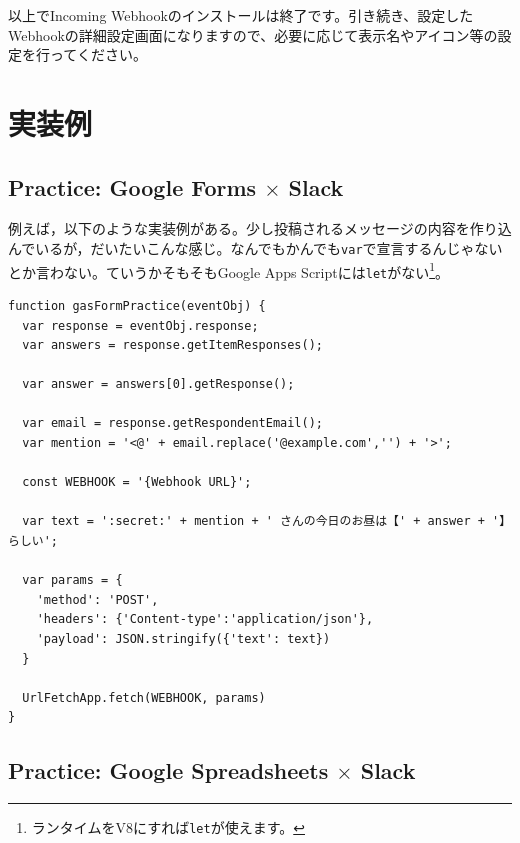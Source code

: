 \documentclass[uplatex,a4j]{jsarticle}
\begin{document}
以上でIncoming Webhookのインストールは終了です。引き続き、設定したWebhookの詳細設定画面になりますので、必要に応じて表示名やアイコン等の設定を行ってください。

\section{実装例}

\subsection{Practice: Google Forms $\times$ Slack}

例えば，以下のような実装例がある。少し投稿されるメッセージの内容を作り込んでいるが，だいたいこんな感じ。なんでもかんでも\verb|var|で宣言するんじゃないとか言わない。ていうかそもそもGoogle Apps Scriptには\verb|let|がない\footnote{ランタイムをV8にすれば\verb|let|が使えます。}。

\begin{lstlisting}[basicstyle=\ttfamily\footnotesize,frame=single,caption=Script Example for Forms practice]
function gasFormPractice(eventObj) {
  var response = eventObj.response;
  var answers = response.getItemResponses();
  
  var answer = answers[0].getResponse();
  
  var email = response.getRespondentEmail();
  var mention = '<@' + email.replace('@example.com','') + '>';
  
  const WEBHOOK = '{Webhook URL}';
  
  var text = ':secret:' + mention + ' さんの今日のお昼は【' + answer + '】らしい';
  
  var params = {
    'method': 'POST',
    'headers': {'Content-type':'application/json'},
    'payload': JSON.stringify({'text': text})
  }
  
  UrlFetchApp.fetch(WEBHOOK, params)
}
\end{lstlisting}

\subsection{Practice: Google Spreadsheets $\times$ Slack}
\end{document}
